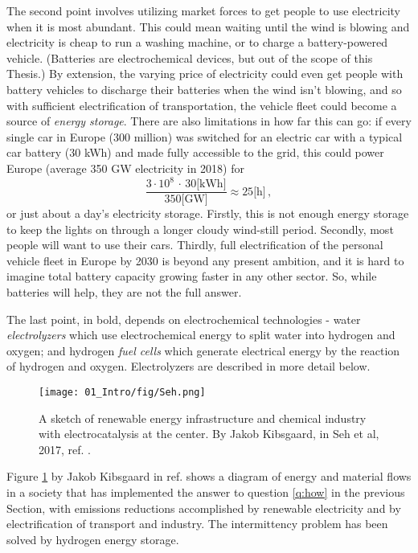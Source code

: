 The second point involves utilizing market forces to get people to use electricity when it is most abundant. This could mean waiting until the wind is blowing and electricity is cheap to run a washing machine, or to charge a battery-powered vehicle. (Batteries are electrochemical devices, but out of the scope of this Thesis.) By extension, the varying price of electricity could even get people with battery vehicles to discharge their batteries when the wind isn't blowing, and so with sufficient electrification of transportation, the vehicle fleet could become a source of \textit{energy storage}. There are also limitations in how far this can go: if every single car in Europe (300 million) was switched for an electric car with a typical car battery (30 kWh) and made fully accessible to the grid, this could power Europe (average 350 GW electricity in 2018) for 
\begin{equation}
\frac{3\cdot{10^8}\,\cdot\, 30 \text{[kWh]}}{350 \text{[GW]}} \approx 25 \text{[h]}\,,\nonumber
\end{equation}
or just about a day's electricity storage. Firstly, this is not enough energy storage to keep the lights on through a longer cloudy wind-still period. Secondly, most people will want to use their cars. Thirdly, full electrification of the personal vehicle fleet in Europe by 2030 is beyond any present ambition\cite{EU2018}, and it is hard to imagine total battery capacity growing faster in any other sector. So, while batteries will help, they are not the full answer.

The last point, in bold, depends on electrochemical technologies - water \textit{electrolyzers} which use electrochemical energy to split water into hydrogen and oxygen; and hydrogen \textit{fuel cells} which generate electrical energy by the reaction of hydrogen and oxygen. Electrolyzers are described in more detail below.
\begin{figure}[h!]
	\centering
	\texttt{[image: 01\_Intro/fig/Seh.png]}
	\caption{A sketch of renewable energy infrastructure and chemical industry with electrocatalysis at the center. By Jakob Kibsgaard, in Seh et al, 2017, ref. .}
	\label{fig:Seh}
\end{figure}

Figure \ref{fig:Seh} by Jakob Kibsgaard in ref.  shows a diagram of energy and material flows in a society that has implemented the answer to question \ref{q:how} in the previous Section, with emissions reductions accomplished by renewable electricity and by electrification of transport and industry. The intermittency problem has been solved by hydrogen energy storage.


